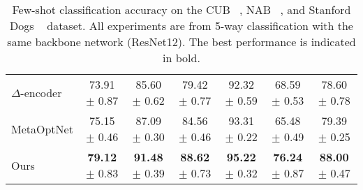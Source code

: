\documentclass[10pt,twocolumn,letterpaper]{article}
\begin{document}
\begin{table*}[t]
{\begin{tabular}{l|cc|cc|cc}
      $\Delta$-encoder \cite{delta-encoder}& 73.91  $\pm$ 0.87 & 85.60  $\pm$ 0.62 & 79.42  $\pm$ 0.77 &  92.32  $\pm$ 0.59 & 68.59  $\pm$ 0.53 & 78.60  $\pm$ 0.78\\
      MetaOptNet \cite{meta-opt}  & 75.15  $\pm$ 0.46 & 87.09  $\pm$ 0.30 & 84.56  $\pm$ 0.46 &  93.31  $\pm$ 0.22 & 65.48  $\pm$ 0.49 & 79.39  $\pm$ 0.25\\
Ours  & \textbf{79.12}  $\pm$ 0.83 & \textbf{91.48}  $\pm$ 0.39 & \textbf{88.62}  $\pm$ 0.73 &  \textbf{95.22}  $\pm$ 0.32 & \textbf{76.24}  $\pm$ 0.87 &  \textbf{88.00}  $\pm$ 0.47\\
      \hline
    \end{tabular}}  

    \caption{Few-shot classification accuracy on the CUB ~\cite{cub}, NAB ~\cite{nab}, and Stanford Dogs ~\cite{dog}  dataset. All experiments are from 5-way classification with the same backbone network (ResNet12).
The best performance is indicated in bold.
    }
    \label{tab:nab}\vspace{-10pt}
  \end{table*}
 
\end{document}
